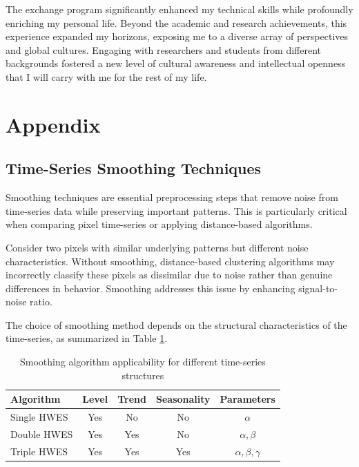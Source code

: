 \documentclass{article} %
\begin{document}
    The exchange program significantly enhanced my technical skills while profoundly enriching my personal life. Beyond the academic and research achievements, this experience expanded my horizons, exposing me to a diverse array of perspectives and global cultures. Engaging with researchers and students from different backgrounds fostered a new level of cultural awareness and intellectual openness that I will carry with me for the rest of my life.


\clearpage


\clearpage

\appendix
{}

\section{Appendix}
\subsection{Time-Series Smoothing Techniques}
\label{appendix1}

        Smoothing techniques are essential preprocessing steps that remove noise from time-series data while preserving important patterns. This is particularly critical when comparing pixel time-series or applying distance-based algorithms.

        Consider two pixels with similar underlying patterns but different noise characteristics. Without smoothing, distance-based clustering algorithms may incorrectly classify these pixels as dissimilar due to noise rather than genuine differences in behavior. Smoothing addresses this issue by enhancing signal-to-noise ratio.

        The choice of smoothing method depends on the structural characteristics of the time-series, as summarized in Table \ref{tab:t1}.

        \begin{table}[h]
        \centering
        \caption{Smoothing algorithm applicability for different time-series structures}
        \label{tab:t1}
        \renewcommand{\arraystretch}{1.3}
            \begin{tabular}{|l|c|c|c|c|}
            \hline
            \textbf{Algorithm} & \textbf{Level} & \textbf{Trend} & \textbf{Seasonality} & \textbf{Parameters} \\
            \hline
            Single HWES  & Yes & No  & No  & $\alpha$ \\
            Double HWES  & Yes & Yes & No  & $\alpha, \beta$ \\
            Triple HWES  & Yes & Yes & Yes & $\alpha, \beta, \gamma$ \\
            \hline
            \end{tabular}
        \end{table}
\end{document}
